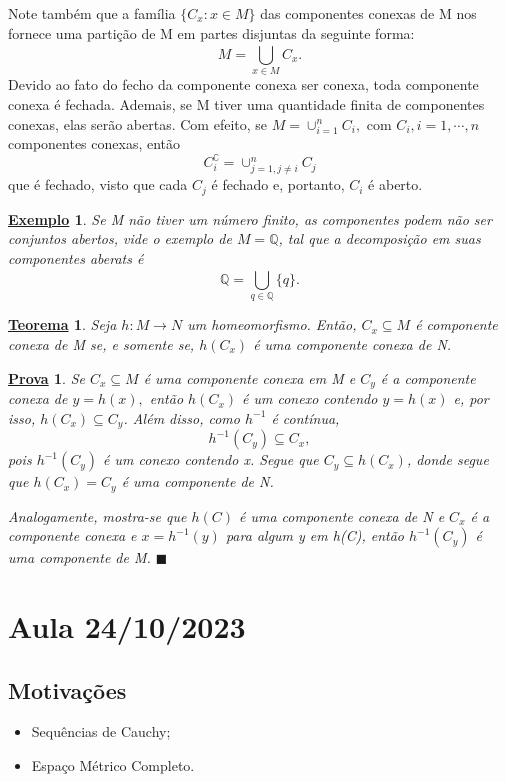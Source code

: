 \documentclass{article}
\newtheorem*{theorem*}{\underline{Teorema}}
\newtheorem{example}{\underline{Exemplo}}
\newtheorem*{proof*}{\underline{Prova}}
\renewcommand\qedsymbol{$\blacksquare$}
\begin{document}
  Note também que a família \(\{C_{x}: x\in M\}\) das componentes conexas de M nos fornece uma partição de M
em partes disjuntas da seguinte forma: 
  \[
    M = \bigcup_{x\in M}^{}{C_{x}}.
  \]
  Devido ao fato do fecho da componente conexa ser conexa, toda componente conexa é fechada. Ademais, se M tiver uma quantidade finita de componentes conexas,
elas serão abertas. Com efeito, se \(M = \cup_{i=1}^{n}C_{i},\) com \(C_{i}, i = 1,\cdots,n\) componentes conexas, então 
  \[
    C_{i}^{\complement} = \cup_{j=1, j\neq i}^{n}C_{j}
  \]
  que é fechado, visto que cada \(C_{j}\) é fechado e, portanto, \(C_{i}\) é aberto.
 \begin{example}
   Se M não tiver um número finito, as componentes podem não ser conjuntos abertos, vide o exemplo de \(M = \mathbb{Q}\), tal que a decomposição em suas componentes aberats é 
     \[
       \mathbb{Q} = \bigcup_{q\in \mathbb{Q}}^{}{\{q\}}.
     \]
 \end{example}
 \begin{theorem*}
   Seja \(h:M\rightarrow N\) um homeomorfismo. Então, \(C_{x}\subseteq{M}\) é componente conexa de M se, e somente se,
 \(h(C_{x})\) é uma componente conexa de N.
 \end{theorem*}
\begin{proof*}
  Se \(C_{x}\subseteq{M}\) é uma componente conexa em M e \(C_{y}\) é a componente conexa de \(y=h(x),\) então \(h(C_{x})\) é
um conexo contendo \(y = h(x)\) e, por isso, \(h(C_{x})\subseteq{C_{y}}\). Além disso, como \(h^{-1}\) é contínua, 
  \[
    h^{-1}(C_{y})\subseteq{C_{x}},
  \]
  pois \(h^{-1}(C_{y})\) é um conexo contendo x. Segue que \(C_{y}\subseteq{h(C_{x})}\), donde segue que \(h(C_{x}) = C_{y}\) é 
uma componente de N.

  Analogamente, mostra-se que \(h(C)\) é uma componente conexa de N e \(C_{x}\) é a componente conexa e \(x=h^{-1}(y)\) para algum y em h(C), então
 \(h^{-1}(C_{y})\) é uma componente de M. \qedsymbol
\end{proof*}
\newpage

\section{Aula 24/10/2023}
\subsection{Motivações} 
\begin{itemize}
  \item Sequências de Cauchy;
  \item Espaço Métrico Completo.
\end{itemize}
\end{document}
